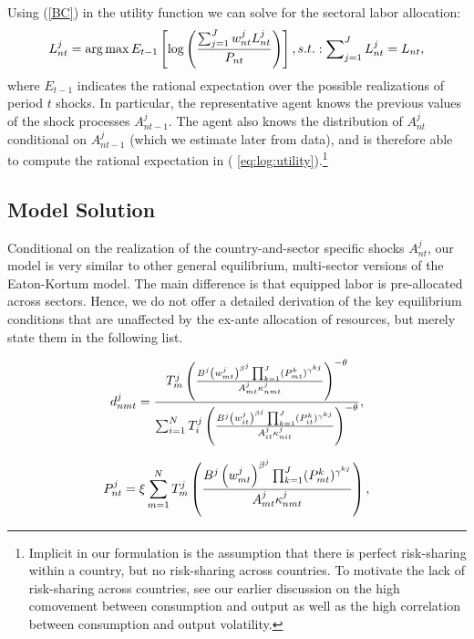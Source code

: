 \documentclass[12pt]{article}
\begin{document}
Using (\ref{BC}) in the utility function we can solve for the sectoral labor
allocation:%
\begin{equation}
L_{nt}^{j}=\arg \max E_{t-1}\left[ \log \left( \frac{%
\sum_{j=1}^{J}w_{nt}^{j}L_{nt}^{j}}{P_{nt}}\right) \right]
,s.t.:\sum\nolimits_{j=1}^{J}L_{nt}^{j}=L_{nt},  \label{eq:log:utility}
\end{equation}%
where $E_{t-1}$ indicates the rational expectation over
the possible realizations of period $t$ shocks. In particular, the
representative agent knows the previous values of the shock processes $%
A_{nt-1}^{j}$. The agent also knows the distribution of $A_{nt}^{j}$ 
conditional on $A_{nt-1}^{j}$ (which we estimate later
from data), and is therefore able to compute the rational expectation in (%
\ref{eq:log:utility}).\footnote{%
Implicit in our formulation is the assumption that there is perfect
risk-sharing within a country, but no risk-sharing across countries. To
motivate the lack of risk-sharing across countries, see our earlier
discussion on the high comovement between consumption and output as well as
the high correlation between consumption and output volatility.}

\subsection{Model Solution}

Conditional on the realization of the country-and-sector specific shocks $%
A_{nt}^{j}$, our model is very similar to other general equilibrium,
multi-sector versions of the Eaton-Kortum model. The main difference is that
equipped labor is pre-allocated across sectors. Hence, we do not offer a
detailed derivation of the key equilibrium conditions that are unaffected by
the ex-ante allocation of resources, but merely state them in the following
list.

\begin{equation}
d_{nmt}^{j}=\frac{T_{m}^{j}\left( \frac{B^{j}\left( w_{mt}^{j}\right)
^{\beta ^{j}}\prod_{k=1}^{J}(P_{mt}^{k})^{\gamma ^{kj}}}{A_{mt}^{j}\kappa
_{nmt}^{j}}\right) ^{-\theta }} {\sum_{i=1}^{N}T_{i}^{j}\left( \frac{%
B^{j}\left( w_{it}^{j}\right) ^{\beta
^{j}}\prod_{k=1}^{J}(P_{it}^{k})^{\gamma ^{kj}}}{A_{it}^{j}\kappa _{nit}^{j}}%
\right) ^{-\theta }},  \label{shares}
\end{equation}

\begin{equation}
P_{nt}^{j}=\xi \sum_{m=1}^{N}T_{m}^{j}\left( \frac{B^{j}\left(
w_{mt}^{j}\right) ^{\beta ^{j}}\prod_{k=1}^{J}(P_{mt}^{k})^{\gamma ^{kj}}}{%
A_{mt}^{j}\kappa _{nmt}^{j}}\right) ,  \label{eq2}
\end{equation}
\end{document}
